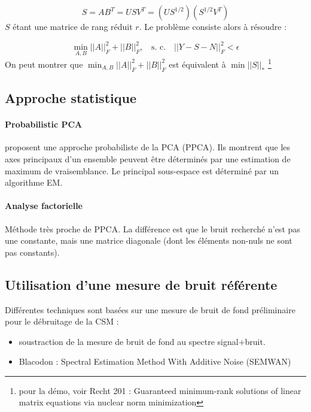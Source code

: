 \begin{equation}
    S=AB^T = USV^T = \left(  US^{1/2} \right) \left(  S^{1/2}V^T \right)
\end{equation}
$S$ étant une matrice de rang réduit $r$. Le problème consiste alors à résoudre : 

\begin{equation}
    \min_{A,B} ||A||_{F}^{2}  + ||B||_{F}^{2},~~~~\text{s. c.~~~} ||Y-S-N||^2_{F} < \epsilon
\end{equation}
On peut montrer que  $\min_{A,B} ||A||_{F}^{2}  + ||B||_{F}^{2}$ est équivalent à $\min ||S||_*$ \footnote{pour la démo, voir Recht 201 : Guaranteed minimum-rank solutions of linear matrix equations via nuclear norm minimization}



\subsection{Approche statistique}

\paragraph{\tbullet Probabilistic PCA}
\cite{Tipping1999} proposent une approche probabiliste de la PCA (PPCA). Ils montrent que les axes principaux d'un ensemble peuvent être déterminés par une estimation de maximum de vraisemblance. Le principal sous-espace est déterminé par un algorithme EM.

\paragraph{\tbullet Analyse factorielle}
Méthode très proche de PPCA. La différence est que le bruit recherché n'est pas une constante, mais une matrice diagonale (dont les éléments non-nuls ne sont pas constants).



\subsection{Utilisation d'une mesure de bruit référente}
Différentes techniques sont basées sur une mesure de bruit de fond préliminaire pour le débruitage de la CSM : 
\begin{itemize}
	\item soustraction de la mesure de bruit de fond au spectre signal+bruit.
	\item Blacodon : Spectral Estimation Method With Additive Noise (SEMWAN)
\end{itemize}


